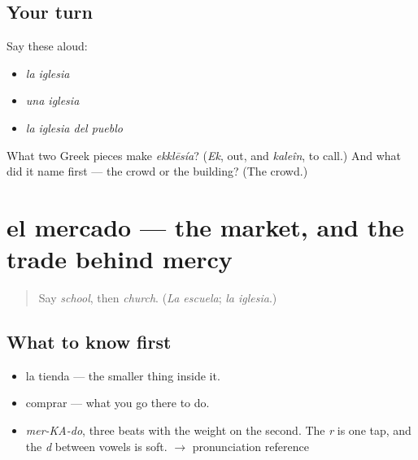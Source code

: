 \subsection*{Your turn}
Say these aloud:

\begin{itemize}
\raggedright
  \item \emph{la iglesia}
  \item \emph{una iglesia}
  \item \emph{la iglesia del pueblo}
\end{itemize}

\begin{tcolorbox}[breakable,colback=teal!4,colframe=teal!35!black,title={Before you move on}]
What two Greek pieces make \emph{ekklēsía}? (\emph{Ek}, out, and \emph{kaleîn}, to call.) And what did it name first — the crowd or the building? (The crowd.)
\end{tcolorbox}
\section[el mercado]{el mercado — the market, and the trade behind mercy}

\label{lesson:ES-C346-mercado}



\begin{quote}
Say \emph{school}, then \emph{church}. (\emph{La escuela}; \emph{la iglesia}.)
\end{quote}

\subsection*{What to know first}
\begin{itemize}
\raggedright
  \item la tienda — the smaller thing inside it.
  \item comprar — what you go there to do.
\end{itemize}

\begin{sounds}
\begin{itemize}
\raggedright
  \item \emph{mer-KA-do}, three beats with the weight on the second. The \emph{r} is one tap, and the \emph{d} between vowels is soft. $\to$ pronunciation reference
\end{itemize}
\end{sounds}

